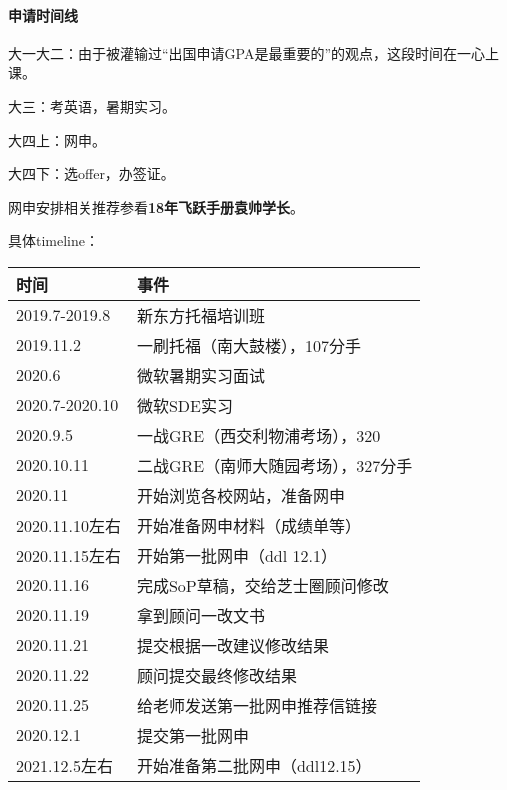 \paragraph{申请时间线}

大一大二：由于被灌输过“出国申请GPA是最重要的”的观点，这段时间在一心上课。

大三：考英语，暑期实习。

大四上：网申。

大四下：选offer，办签证。

网申安排相关推荐参看{\bf 18年飞跃手册袁帅学长}。

具体timeline：
\begin{longtable}{l|l}
\hline
时间              & 事件                                          \\\hline
2019.7-2019.8   & 新东方托福培训班                                  \\
2019.11.2       & 一刷托福（南大鼓楼），107分手                                  \\
2020.6          & 微软暑期实习面试                                  \\
2020.7-2020.10  & 微软SDE实习                                     \\
2020.9.5          & 一战GRE（西交利物浦考场），320                                   \\
2020.10.11         & 二战GRE（南师大随园考场），327分手                                 \\
2020.11         & 开始浏览各校网站，准备网申                               \\
2020.11.10左右    & 开始准备网申材料（成绩单等）                              \\
2020.11.15左右    & 开始第一批网申（ddl 12.1）                           \\
2020.11.16      & 完成SoP草稿，交给芝士圈顾问修改                           \\
2020.11.19      & 拿到顾问一改文书                                    \\
2020.11.21      & 提交根据一改建议修改结果                                \\
2020.11.22      & 顾问提交最终修改结果                                  \\
2020.11.25      & 给老师发送第一批网申推荐信链接                             \\
2020.12.1       & 提交第一批网申                                     \\
2021.12.5左右     & 开始准备第二批网申（ddl12.15）                         \\

\end{longtable}
